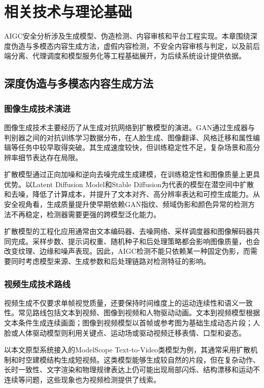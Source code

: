 
\chapter{相关技术与理论基础}

AIGC安全分析涉及生成模型、伪造检测、内容审核和平台工程实现。本章围绕深度伪造与多模态内容生成方法，虚假内容检测，不安全内容审核与判定，以及前后端分离、代理调度和模型服务化等工程基础展开，为后续系统设计提供依据。

\section{深度伪造与多模态内容生成方法}

\subsection{图像生成技术演进}

图像生成技术主要经历了从生成对抗网络到扩散模型的演进。GAN通过生成器与判别器之间的对抗训练学习数据分布，在人脸生成、图像翻译、风格迁移和属性编辑等任务中较早取得突破\cite{ref1,ref2,ref3}。其生成速度较快，但训练稳定性不足，复杂场景和高分辨率细节表达存在局限。

扩散模型通过正向加噪和逆向去噪完成生成建模，在训练稳定性和图像质量上更具优势\cite{ref4,ref5}。以Latent Diffusion Model和Stable Diffusion为代表的模型在潜空间中扩散和去噪，降低了计算成本，并提升了文本对齐、高分辨率表达和可控生成能力\cite{ref6,ref7,ref19}。从安全视角看，生成质量提升使早期依赖GAN指纹、频域伪影和颜色异常的检测方法不再稳定，检测器需要更强的跨模型泛化能力。

扩散模型的工程化应用通常由文本编码器、去噪网络、采样调度器和图像解码器共同完成。采样步数、提示词权重、随机种子和后处理策略都会影响图像质量，也会改变纹理、边缘和噪声表现。因此，AIGC检测不能只依赖某一种固定伪影，而需要同时考虑模型来源、生成参数和后处理链路对检测特征的影响。

\subsection{视频生成技术路线}

视频生成不仅要求单帧视觉质量，还要保持时间维度上的运动连续性和语义一致性。常见路线包括文本到视频、图像到视频和人物驱动动画。文本到视频模型根据文本条件生成连续画面；图像到视频模型以首帧或参考图为基础生成动态片段；人脸或人体驱动模型则利用关键点、运动场或驱动视频迁移表情、口型和姿态。

以本文原型系统接入的ModelScope Text-to-Video类模型为例，其通常采用扩散机制和时空建模结构生成短视频\cite{ref20}。这类模型能够生成较自然的片段，但在复杂动作、长时一致性、文字渲染和物理规律表达上仍可能出现局部闪烁、结构漂移和运动不连续等问题，这些现象也为视频检测提供了线索。

